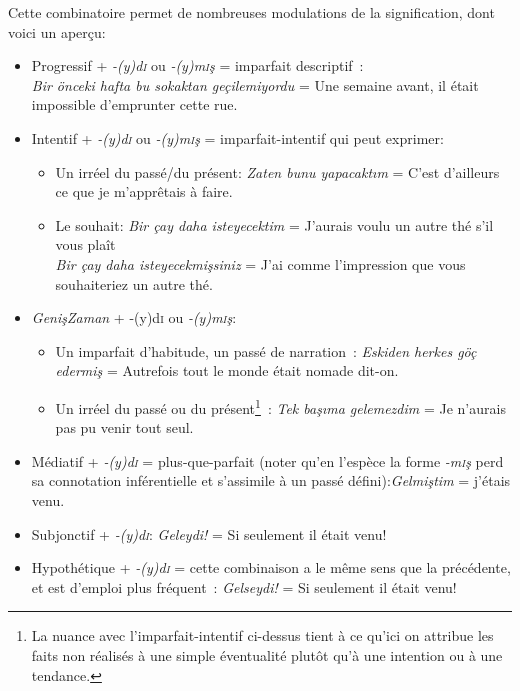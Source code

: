 \documentclass{cours}
\newcommand{\ch}{\c{s}}
\newcommand{\sci}{\textsc{i}}
\begin{document}
Cette combinatoire permet de nombreuses modulations de la signification, dont voici un aperçu:
\begin{itemize}
    \item Progressif + \textsl{-(y)d\sci} ou \textsl{-(y)m\sci \ch} = imparfait descriptif~:\\
          \textsl{Bir önceki hafta bu sokaktan geçilemiyordu} = Une semaine avant, il était impossible d'emprunter cette rue.
    \item Intentif + {\sl -(y)d\sci} ou {\sl -(y)m\sci \ch} = imparfait-intentif qui peut exprimer:
          \begin{itemize}
              \item Un irréel du passé/du présent: \textsl{Zaten bunu yapacakt\i m} = C'est d'ailleurs ce que je m'apprêtais à faire.
              \item Le souhait: \textsl{Bir çay daha isteyecektim} = J'aurais voulu un autre thé s'il vous plaît \\
                    \textsl{Bir çay daha isteyecekmi\ch siniz} = J'ai comme l'impression que vous souhaiteriez un autre thé.
          \end{itemize}
    \item \textsl{Geni\ch Zaman} + {-(y)d\sci} ou {\sl -(y)m\sci \ch}:
          \begin{itemize}
              \item Un imparfait d'habitude, un passé de narration~: \textsl{Eskiden herkes göç edermi\ch} = Autrefois tout le monde était nomade dit-on.
              \item Un irréel du passé ou du présent\footnote{La nuance avec l'imparfait-intentif ci-dessus tient à ce qu'ici on attribue les faits non réalisés à une simple éventualité plutôt qu'à une intention ou à une tendance.}~: \textsl{Tek ba\ch\i ma gelemezdim} = Je n'aurais pas pu venir tout seul.
          \end{itemize}
    \item Médiatif + {\sl -(y)d\sci} = plus-que-parfait (noter qu'en l'espèce la forme \textsl{-m\sci \ch} perd sa connotation inférentielle et s'assimile à un passé défini):\textsl{Gelmi\ch tim} = j'étais venu.
    \item Subjonctif + {\sl -(y)d\sci}: \textsl{Geleydi!} = Si seulement il était venu!
    \item Hypothétique + {\sl -(y)d\sci} = cette combinaison a le même sens que la précédente, et est d'emploi plus fréquent~: \textsl{Gelseydi!} = Si seulement il était venu!
\end{itemize}
\end{document}
